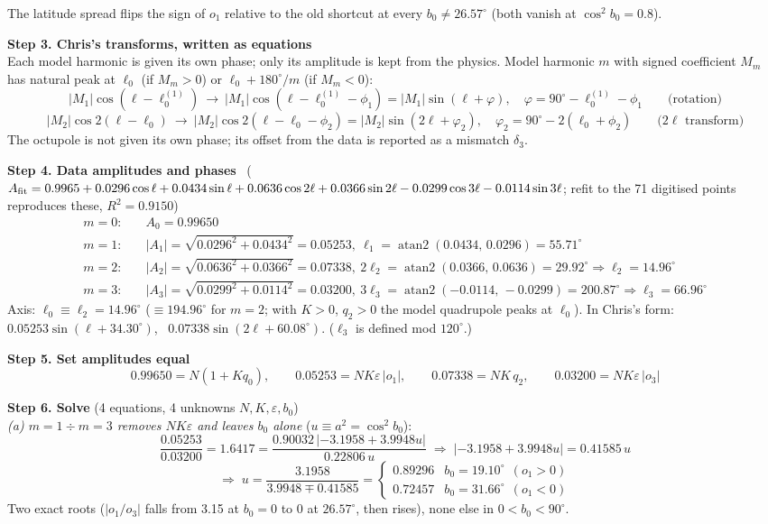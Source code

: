 \documentclass[11pt]{article}
\begin{document}
The latitude spread flips the sign of $o_1$ relative to the old shortcut at every $b_0\ne26.57^\circ$ (both vanish at $\cos^2b_0=0.8$).

\medskip\textbf{Step 3. Chris's transforms, written as equations}\\[2pt]
Each model harmonic is given its own phase; only its amplitude is kept from the physics. Model harmonic $m$ with signed coefficient $M_m$ has natural peak at
$\ell_0$ (if $M_m>0$) or $\ell_0+180^\circ/m$ (if $M_m<0$):
\[
|M_1|\cos(\ell-\ell_0^{(1)})\ \to\ |M_1|\cos(\ell-\ell_0^{(1)}-\phi_1)=|M_1|\sin(\ell+\varphi),\quad \varphi=90^\circ-\ell_0^{(1)}-\phi_1\qquad\text{(rotation)}
\]
\[
|M_2|\cos2(\ell-\ell_0)\ \to\ |M_2|\cos2(\ell-\ell_0-\phi_2)=|M_2|\sin(2\ell+\varphi_2),\quad \varphi_2=90^\circ-2(\ell_0+\phi_2)\qquad\text{($2\ell$ transform)}
\]
The octupole is not given its own phase; its offset from the data is reported as a mismatch $\delta_3$.

\medskip\textbf{Step 4. Data amplitudes and phases} \ ($A_{\rm fit}=0.9965+0.0296\cos\ell+0.0434\sin\ell+0.0636\cos2\ell+0.0366\sin2\ell-0.0299\cos3\ell-0.0114\sin3\ell$;
refit to the 71 digitised points reproduces these, $R^2=0.9150$)
\begin{align*}
m=0:&\quad A_0=0.99650\\
m=1:&\quad |A_1|=\sqrt{0.0296^2+0.0434^2}=0.05253,\  \ell_1=\operatorname{atan2}(0.0434,\,0.0296)=55.71^\circ\\
m=2:&\quad |A_2|=\sqrt{0.0636^2+0.0366^2}=0.07338,\  2\ell_2=\operatorname{atan2}(0.0366,\,0.0636)=29.92^\circ\Rightarrow\ell_2=14.96^\circ\\
m=3:&\quad |A_3|=\sqrt{0.0299^2+0.0114^2}=0.03200,\  3\ell_3=\operatorname{atan2}(-0.0114,\,-0.0299)=200.87^\circ\Rightarrow\ell_3=66.96^\circ
\end{align*}
Axis: $\ell_0\equiv\ell_2=14.96^\circ$ ($\equiv194.96^\circ$ for $m{=}2$; with $K>0$, $q_2>0$ the model quadrupole peaks at $\ell_0$). In Chris's form: $0.05253\sin(\ell+34.30^\circ)$, \ $0.07338\sin(2\ell+60.08^\circ)$. ($\ell_3$ is defined mod $120^\circ$.)

\medskip\textbf{Step 5. Set amplitudes equal}
\[
0.99650=N(1+Kq_0),\qquad 0.05253=NK\varepsilon\,|o_1|,\qquad 0.07338=NK\,q_2,\qquad 0.03200=NK\varepsilon\,|o_3|
\]

\medskip\textbf{Step 6. Solve} (4 equations, 4 unknowns $N,K,\varepsilon,b_0$)\\[2pt]
\emph{(a) $m{=}1\div m{=}3$ removes $NK\varepsilon$ and leaves $b_0$ alone} ($u\equiv a^2=\cos^2b_0$):
\[
\frac{0.05253}{0.03200}=1.6417=\frac{0.90032\,|{-3.1958}+3.9948u|}{0.22806\,u}
\;\Rightarrow\;|{-3.1958}+3.9948u|=0.41585\,u
\]
\[
\Rightarrow\;u=\frac{3.1958}{3.9948\mp0.41585}=\begin{cases}0.89296 & b_0=19.10^\circ\ \ (o_1>0)\\ 0.72457 & b_0=31.66^\circ\ \ (o_1<0)\end{cases}
\]
Two exact roots ($|o_1/o_3|$ falls from 3.15 at $b_0=0$ to 0 at $26.57^\circ$, then rises), none else in $0<b_0<90^\circ$.
\end{document}
